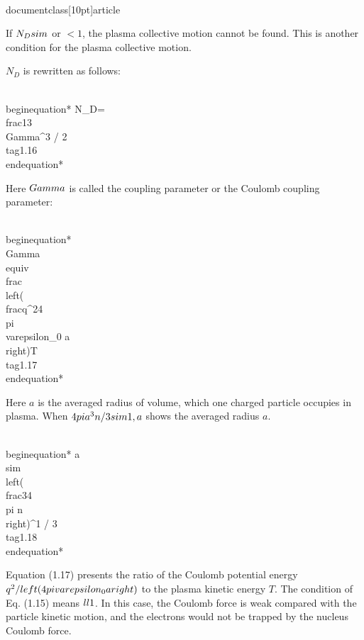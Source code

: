 \\documentclass[10pt]{article}
\begin{document}
If $N_{D} \\sim$ or $<1$, the plasma collective motion cannot be found. This is another condition for the plasma collective motion.

$N_{D}$ is rewritten as follows:


\\begin{equation*}
N_{D}=\\frac{1}{3 \\Gamma^{3 / 2}} \\tag{1.16}
\\end{equation*}


Here $\\Gamma$ is called the coupling parameter or the Coulomb coupling parameter:


\\begin{equation*}
\\Gamma \\equiv \\frac{\\left(\\frac{q^{2}}{4 \\pi \\varepsilon_{0} a}\\right)}{T} \\tag{1.17}
\\end{equation*}


Here $a$ is the averaged radius of volume, which one charged particle occupies in plasma. When $4 \\pi a^{3} n / 3 \\sim 1, a$ shows the averaged radius $a$.


\\begin{equation*}
a \\sim\\left(\\frac{3}{4 \\pi n}\\right)^{1 / 3} \\tag{1.18}
\\end{equation*}


Equation (1.17) presents the ratio of the Coulomb potential energy $q^{2} /\\left(4 \\pi \\varepsilon_{0} a\\right)$ to the plasma kinetic energy $T$. The condition of Eq. (1.15) means $\\ll 1$. In this case, the Coulomb force is weak compared with the particle kinetic motion, and the electrons would not be trapped by the nucleus Coulomb force.
\end{document}
